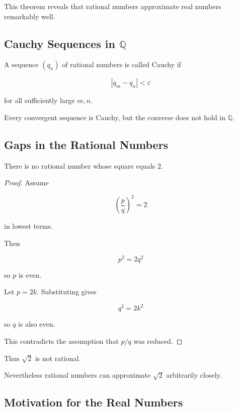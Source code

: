 This theorem reveals that rational numbers approximate real numbers
remarkably well.

\subsection{Cauchy Sequences in $\mathbb{Q}$}

\begin{definition}

A sequence $(q_n)$ of rational numbers is called Cauchy if

\[
|q_m-q_n|<\varepsilon
\]

for all sufficiently large $m,n$.

\end{definition}

Every convergent sequence is Cauchy, but the converse does not hold
in $\mathbb{Q}$.

\subsection{Gaps in the Rational Numbers}

\begin{theorem}

There is no rational number whose square equals $2$.

\end{theorem}

\begin{proof}

Assume

\[
\left(\frac{p}{q}\right)^2 = 2
\]

in lowest terms.

Then

\[
p^2 = 2q^2
\]

so $p$ is even.

Let $p=2k$. Substituting gives

\[
q^2 = 2k^2
\]

so $q$ is also even.

This contradicts the assumption that $p/q$ was reduced.

\end{proof}

Thus $\sqrt{2}$ is not rational.

Nevertheless rational numbers can approximate $\sqrt{2}$ arbitrarily
closely.

\subsection{Motivation for the Real Numbers}

